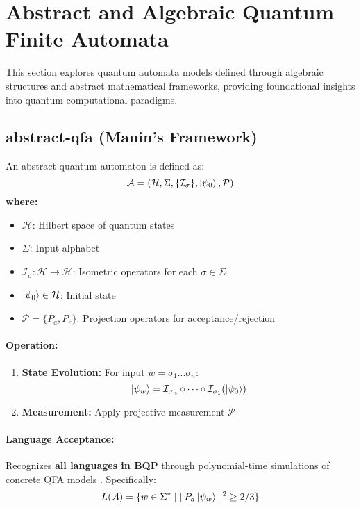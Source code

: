 \section{Abstract and Algebraic Quantum Finite Automata}
\label{sec:abstract-qfa}

This section explores quantum automata models defined through algebraic structures and abstract mathematical frameworks, providing foundational insights into quantum computational paradigms.

\subsection{\acrfull{abstract-qfa} (Manin's Framework)}
\label{subsec:abstract-qfa}

\begin{definition}
An abstract quantum automaton is defined as:
\[
\mathcal{A} = (\mathcal{H}, \Sigma, \{\mathcal{I}_\sigma\}, \ket{\psi_0}, \mathcal{P})
\]
\textbf{where:}
\begin{itemize}
    \item $\mathcal{H}$: Hilbert space of quantum states
    \item $\Sigma$: Input alphabet
    \item $\mathcal{I}_\sigma: \mathcal{H} \rightarrow \mathcal{H}$: Isometric operators for each $\sigma \in \Sigma$
    \item $\ket{\psi_0} \in \mathcal{H}$: Initial state
    \item $\mathcal{P} = \{P_a, P_r\}$: Projection operators for acceptance/rejection
\end{itemize}
\end{definition}

\paragraph{Operation:}
\begin{enumerate}
    \item \textbf{State Evolution:} For input $w = \sigma_1...\sigma_n$:
    \[
    \ket{\psi_w} = \mathcal{I}_{\sigma_n} \circ \cdots \circ \mathcal{I}_{\sigma_1} (\ket{\psi_0})
    \]
    \item \textbf{Measurement:} Apply projective measurement $\mathcal{P}$
\end{enumerate}

\paragraph{Language Acceptance:}
Recognizes \textbf{all languages in BQP} through polynomial-time simulations of concrete QFA models \cite{moore2000quantum}. Specifically:
\[
L(\mathcal{A}) = \{w \in \Sigma^* \mid \|P_a\ket{\psi_w}\|^2 \geq 2/3\}
\]

